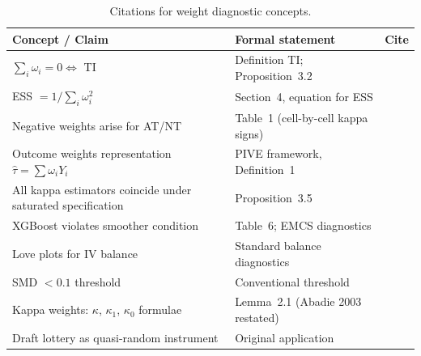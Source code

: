 \documentclass[12pt, a4paper]{article}
\begin{document}
\begin{table}[ht]
\centering
\caption{Citations for weight diagnostic concepts.}
\label{tab:citations}
\begin{tabular}{L{5cm} L{5.5cm} L{3cm}}
\toprule
\textbf{Concept / Claim} & \textbf{Formal statement} & \textbf{Cite} \\
\midrule
$\sum_i \omega_i = 0 \Leftrightarrow$ TI &
  Definition TI; Proposition~3.2 &
  \citet{sloczyn2025kappa} \\
\addlinespace
ESS $= 1/\sum_i \omega_i^2$ &
  Section~4, equation for ESS &
  \citet{knaus2024outcome} \\
\addlinespace
Negative weights arise for AT/NT &
  Table~1 (cell-by-cell kappa signs) &
  \citet{sloczyn2025kappa} \\
\addlinespace
Outcome weights representation $\hat{\tau} = \sum \omega_i Y_i$ &
  PIVE framework, Definition~1 &
  \citet{knaus2024outcome} \\
\addlinespace
All kappa estimators coincide under saturated specification &
  Proposition~3.5 &
  \citet{sloczyn2025kappa} \\
\addlinespace
XGBoost violates smoother condition &
  Table~6; EMCS diagnostics &
  \citet{knaus2024outcome} \\
\addlinespace
Love plots for IV balance &
  Standard balance diagnostics &
  \citet{austin2015moving} \\
\addlinespace
SMD $< 0.1$ threshold &
  Conventional threshold &
  \citet{austin2009using} \\
\addlinespace
Kappa weights: $\kappa$, $\kappa_1$, $\kappa_0$ formulae &
  Lemma~2.1 (Abadie 2003 restated) &
  \citet{abadie2003semiparametric} \\
\addlinespace
Draft lottery as quasi-random instrument &
  Original application &
  \citet{angrist1990lifetime} \\
\bottomrule
\end{tabular}
\end{table}
\end{document}
